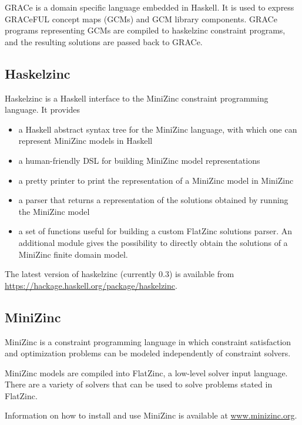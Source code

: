 GRACe is a domain specific language embedded in Haskell.
%
It is used to express GRACeFUL concept maps (GCMs) and GCM library
components.
%
GRACe programs representing GCMs are compiled to haskelzinc constraint
programs, and the resulting solutions are passed back to GRACe.

\subsection*{Haskelzinc}

Haskelzinc is a Haskell interface to the MiniZinc constraint
programming language.
%
It provides
\begin{itemize}
\item a Haskell abstract syntax tree for the MiniZinc language, with
  which one can represent MiniZinc models in Haskell
\item a human-friendly DSL for building MiniZinc model representations
\item a pretty printer to print the representation of a MiniZinc model
  in MiniZinc
\item a parser that returns a representation of the solutions obtained
  by running the MiniZinc model
\item a set of functions useful for building a custom FlatZinc
  solutions parser.
  An additional module gives the possibility to directly obtain the
  solutions of a MiniZinc finite domain model.
\end{itemize}

The latest version of haskelzinc (currently 0.3) is available from
\url{https://hackage.haskell.org/package/haskelzinc}.

\subsection*{MiniZinc}

MiniZinc is a constraint programming language in which constraint satisfaction
and optimization problems can be modeled independently of constraint solvers.

MiniZinc models are compiled into FlatZinc, a low-level solver input language.
There are a variety of solvers that can be used to solve problems stated in
FlatZinc.

Information on how to install and use MiniZinc is available at
\url{www.minizinc.org}.
